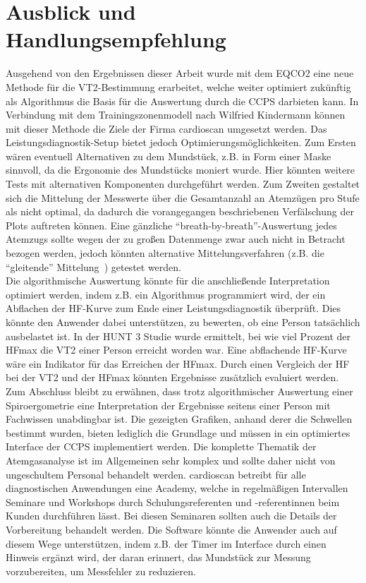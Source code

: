 \section{Ausblick und Handlungsempfehlung}
%
Ausgehend von den Ergebnissen dieser Arbeit wurde mit dem \gls{EQCO2} eine neue Methode für die VT2-Bestimmung erarbeitet, welche weiter optimiert zukünftig als Algorithmus die Basis für die Auswertung durch die \gls{CCPS} darbieten kann. In Verbindung mit dem Trainingszonenmodell nach Wilfried Kindermann können mit dieser Methode die Ziele der Firma cardioscan umgesetzt werden. Das Leistungsdiagnostik-Setup bietet jedoch Optimierungsmöglichkeiten. Zum Ersten wären eventuell Alternativen zu dem Mundstück, z.B. in Form einer Maske sinnvoll, da die Ergonomie des Mundstücks moniert wurde. Hier könnten weitere Tests mit alternativen Komponenten durchgeführt werden. Zum Zweiten gestaltet sich die Mittelung der Messwerte über die Gesamtanzahl an Atemzügen pro Stufe als nicht optimal, da dadurch die vorangegangen beschriebenen Verfälschung der Plots auftreten können. Eine gänzliche "`breath-by-breath"'-Auswertung jedes Atemzugs sollte wegen der zu großen Datenmenge zwar auch nicht in Betracht bezogen werden, jedoch könnten alternative Mittelungsverfahren (z.B. die "`gleitende"' Mittelung~\cite{Kroidl.2015}) getestet werden.\\
Die algorithmische Auswertung könnte für die anschließende Interpretation optimiert werden, indem z.B. ein Algorithmus programmiert wird, der ein Abflachen der \gls{HF}-Kurve zum Ende einer Leistungsdiagnostik überprüft. Dies könnte den Anwender dabei unterstützen, zu bewerten, ob eine Person tatsächlich ausbelastet ist. In der HUNT 3 Studie wurde ermittelt, bei wie viel Prozent der \gls{HFmax} die VT2 einer Person erreicht worden war. Eine abflachende \gls{HF}-Kurve wäre ein Indikator für das Erreichen der \gls{HFmax}. Durch einen Vergleich der \gls{HF} bei der VT2 und der \gls{HFmax} könnten Ergebnisse zusätzlich evaluiert werden.\\
Zum Abschluss bleibt zu erwähnen, dass trotz algorithmischer Auswertung einer Spiroergometrie eine Interpretation der Ergebnisse seitens einer Person mit Fachwissen unabdingbar ist. Die gezeigten Grafiken, anhand derer die Schwellen bestimmt wurden, bieten lediglich die Grundlage und müssen in ein optimiertes Interface der \gls{CCPS} implementiert werden. Die komplette Thematik der Atemgasanalyse ist im Allgemeinen sehr komplex und sollte daher nicht von ungeschultem Personal behandelt werden. cardioscan betreibt für alle diagnostischen Anwendungen eine Academy, welche in regelmäßigen Intervallen Seminare und Workshops durch Schulungsreferenten und -referentinnen beim Kunden durchführen lässt. Bei diesen Seminaren sollten auch die Details der Vorbereitung behandelt werden. Die Software könnte die Anwender auch auf diesem Wege unterstützen, indem z.B. der Timer im Interface durch einen Hinweis ergänzt wird, der daran erinnert, das Mundstück zur Messung vorzubereiten, um Messfehler zu reduzieren.
%
\nocite{*}


%
\printbibliography

